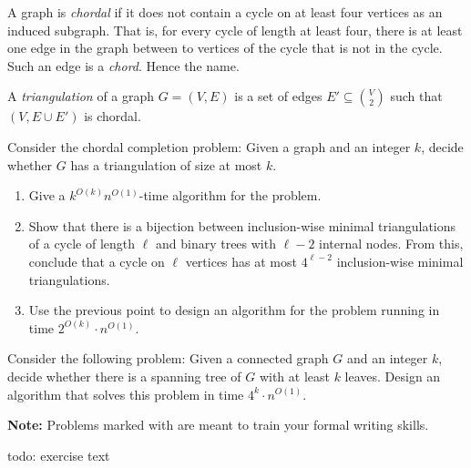 \documentclass{uebung_cs}
\begin{document}
\begin{exercise}
A graph is \emph{chordal} if it does not contain a cycle on at least four vertices as an induced subgraph.
That is, for every cycle of length at least four, 
there is at least one edge in the graph between to vertices of the cycle that is not in the cycle. 
Such an edge is a \emph{chord}. Hence the name.

A \emph{triangulation} of a graph $G=(V,E)$ is a set of edges $E' \subseteq \binom{V}{2}$ such that $(V,E\cup E')$ is chordal.

Consider the chordal completion problem: Given a graph and an integer $k$, decide whether $G$ has a triangulation of size at most $k$. 
\begin{enumerate}
\item Give a $k^{O(k)} n^{O(1)}$-time algorithm for the problem.
\item Show that there is a bijection between inclusion-wise minimal triangulations of a cycle of length $\ell$ and binary trees with $\ell-2$ internal nodes. From this, conclude that a cycle on $\ell$ vertices has at most $4^{\ell-2}$ inclusion-wise minimal triangulations.
\item Use the previous point to design an algorithm for the problem running in time $2^{O(k)} \cdot n^{O(1)}$.
\end{enumerate}
\end{exercise}

\begin{exercise}
Consider the following problem: Given a connected graph $G$ and an integer $k$, decide whether there is a spanning tree of $G$ with at least $k$ leaves. Design an algorithm that solves this problem in time $4^k \cdot n^{O(1)}$.
\end{exercise}

\newpage
\textbf{Note:} Problems marked with \schriftlich are meant to train your formal writing skills.

\begin{exercise}
  todo: exercise text
\end{exercise}
\end{document}
